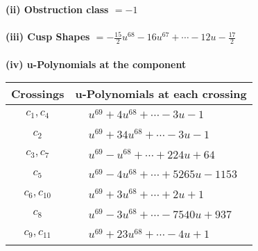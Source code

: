 \documentclass[1p]{elsarticle_modified}
\theoremstyle{definition}
\begin{document}
\flushleft \textbf{(ii) Obstruction class $= -1$}\\~\\
\flushleft \textbf{(iii) Cusp Shapes $= -\frac{15}{2} u^{68}-16 u^{67}+\cdots-12 u-\frac{17}{2}$}\\~\\
\newpage\renewcommand{\arraystretch}{1}
\flushleft \textbf{(iv) u-Polynomials at the component}\newline \\
\begin{tabular}{m{50pt}|m{274pt}}
Crossings & \hspace{64pt}u-Polynomials at each crossing \\
\hline $$\begin{aligned}c_{1},c_{4}\end{aligned}$$&$\begin{aligned}
&u^{69}+4 u^{68}+\cdots-3 u-1
\end{aligned}$\\
\hline $$\begin{aligned}c_{2}\end{aligned}$$&$\begin{aligned}
&u^{69}+34 u^{68}+\cdots-3 u-1
\end{aligned}$\\
\hline $$\begin{aligned}c_{3},c_{7}\end{aligned}$$&$\begin{aligned}
&u^{69}- u^{68}+\cdots+224 u+64
\end{aligned}$\\
\hline $$\begin{aligned}c_{5}\end{aligned}$$&$\begin{aligned}
&u^{69}-4 u^{68}+\cdots+5265 u-1153
\end{aligned}$\\
\hline $$\begin{aligned}c_{6},c_{10}\end{aligned}$$&$\begin{aligned}
&u^{69}+3 u^{68}+\cdots+2 u+1
\end{aligned}$\\
\hline $$\begin{aligned}c_{8}\end{aligned}$$&$\begin{aligned}
&u^{69}-3 u^{68}+\cdots-7540 u+937
\end{aligned}$\\
\hline $$\begin{aligned}c_{9},c_{11}\end{aligned}$$&$\begin{aligned}
&u^{69}+23 u^{68}+\cdots-4 u+1
\end{aligned}$\\
\hline
\end{tabular}\\~\\
\end{document}
